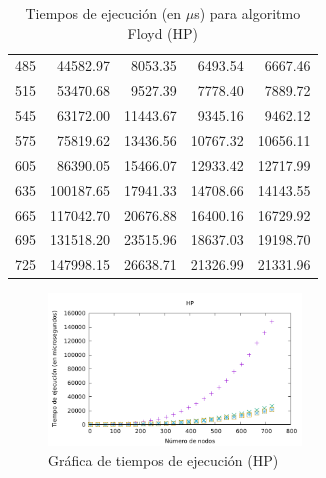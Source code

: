 \documentclass{homework}
\begin{document}
\begin{table}[h]
\begin{tabular}{|r|r|r|r|r|}
            485 & 44582.97 & 8053.35 & 6493.54 & 6667.46 \\ 
            515 & 53470.68 & 9527.39 & 7778.40 & 7889.72 \\ 
            545 & 63172.00 & 11443.67 & 9345.16 & 9462.12 \\ 
            575 & 75819.62 & 13436.56 & 10767.32 & 10656.11 \\ 
            605 & 86390.05 & 15466.07 & 12933.42 & 12717.99 \\ 
            635 & 100187.65 & 17941.33 & 14708.66 & 14143.55 \\ 
            665 & 117042.70 & 20676.88 & 16400.16 & 16729.92 \\ 
            695 & 131518.20 & 23515.96 & 18637.03 & 19198.70 \\ 
            725 & 147998.15 & 26638.71 & 21326.99 & 21331.96 \\ 
            \hline
        \end{tabular}
        \caption{Tiempos de ejecución (en $\mu$s) para algoritmo Floyd (HP)}
    \end{table}

    \begin{figure}[h]
        \centering
        \includegraphics[width=0.6\textwidth]{../data/hp_opt.pdf}
        \caption{Gráfica de tiempos de ejecución (HP)}
    \end{figure}
\end{document}
